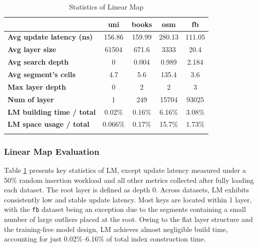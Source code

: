 \begin{table}
  \caption{Statistics of Linear Map}
  \small
  \begin{tabular}{lcccc}
    \toprule
     &\textbf{uni}&\textbf{books}&\textbf{osm}&\textbf{fb}\\
    \midrule
    \textbf{Avg update latency (ns)}	& 156.86 & 159.99 & 280.13 & 111.05\\
    \textbf{Avg layer size}			& 61504	&671.6	&3333	&20.4\\
    \textbf{Avg search depth}			& 0	&0.004	&0.989	&2.184\\
    \textbf{Avg segment's cells}			& 4.7	&5.6	&135.4	&3.6\\
    \textbf{Max layer depth}			& 0	&2	&2	&3\\
    \textbf{Num of layer} 			& 1	&249	&15704	&93025\\
    \textbf{LM building time / total}	    & 0.02\% & 0.16\% & 6.16\% & 3.08\%\\
    \textbf{LM space usage / total}	    & 0.066\% & 0.17\% & 15.7\% & 1.73\%\\
  \bottomrule
  \label{tab:lm_info}
\end{tabular}
\end{table}
\subsubsection{Linear Map Evaluation} 
\label{sec:lm_eval}
Table \ref{tab:lm_info} presents key statistics of LM, except update latency measured under a 50\% random insertion workload and all other metrics collected after fully loading each dataset. The root layer is defined as depth 0. Across datasets, LM exhibits consistently low and stable update latency. Most keys are located within 1 layer, with the \texttt{fb} dataset being an exception due to the segments containing a small number of large outliers placed at the root. Owing to the flat layer structure and the training-free model design, LM achieves almost negligible build time, accounting for just 0.02\%–6.16\% of total index construction time.


